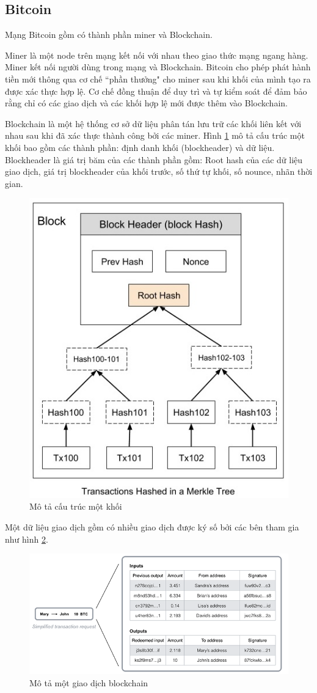 \subsection{Bitcoin}
Mạng Bitcoin gồm có thành phần miner và Blockchain.

Miner là một node trên mạng kết nối với nhau theo giao thức mạng ngang hàng.
Miner kết nối người dùng trong mạng và Blockchain.
Bitcoin cho phép phát hành tiền mới thông qua cơ chế ``phần thưởng" cho miner sau khi khối của mình tạo ra được xác thực hợp lệ. 
Cơ chế đồng thuận để duy trì và tự kiểm soát để đảm bảo rằng chỉ có các giao dịch và các khối hợp lệ mới được thêm vào Blockchain.

Blockchain là một hệ thống cơ sở dữ liệu phân tán lưu trữ các khối liên kết với nhau sau khi đã xác thực thành công bởi các miner. Hình \ref{fig:merkle_bitcoin} mô tả cấu trúc một khối bao gồm các thành phần: định danh khối (blockheader) và dữ liệu.
Blockheader là giá trị băm của các thành phần gồm: Root hash của các dữ liệu giao dịch, giá trị blockheader của khối trước, số thứ tự khối, số nounce, nhãn thời gian.

\begin{figure}[htbp]
\centering
\includegraphics[width=.5\linewidth]{img/merkle_tree.jpg}
\caption{Mô tả cấu trúc một khối}
\label{fig:merkle_bitcoin}
\end{figure}

Một dữ liệu giao dịch gồm có nhiều giao dịch được ký số bởi các bên tham gia như hình \ref{fig:trans_bitcoin}.

\begin{figure}[htbp]
\centering
\includegraphics[width=.9\linewidth]{img/trans_bitcoin.png}
\caption{Mô tả một giao dịch blockchain}
\label{fig:trans_bitcoin}
\end{figure}


